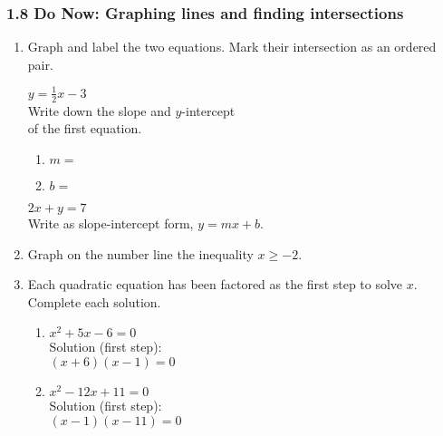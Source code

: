 \documentclass[12pt, twoside]{article}
\begin{document}
\subsubsection*{1.8 Do Now: Graphing lines and finding intersections}
\begin{enumerate}
  \item Graph and label the two equations. Mark their intersection as an ordered pair.

  \begin{multicols}{2}
    $y = \frac{1}{2}x-3$ \\[0.25cm]
    Write down the slope and $y$-intercept\\ of the first equation.
    \begin{enumerate}
      \item $m=$ \bigskip
      \item $b=$
    \end{enumerate}
    \columnbreak
    $2x+y = 7$ \\[0.5cm]
        Write as slope-intercept form, $y=mx+b$.
    \end{multicols}

  \begin{center} %
  \end{center}

\item Graph on the number line the inequality $x \geq -2$. \vspace{0.5cm}
  \begin{center}
    \end{center}

\newpage
\item Each quadratic equation has been factored as the first step to solve $x$. Complete each solution.
\begin{multicols}{2}
  \begin{enumerate}[itemsep=5cm]
    \item $x^2 + 5x - 6 = 0$ \\[0.5cm]
      Solution (first step): \\
      $(x + 6)(x - 1) = 0$
    \item $x^2 - 12x + 11 = 0$ \\[0.5cm]
      Solution (first step): \\
      $(x - 1)(x - 11) = 0$
    \end{enumerate}
    \end{multicols} \vspace{2cm}


\end{enumerate}
\end{document}
